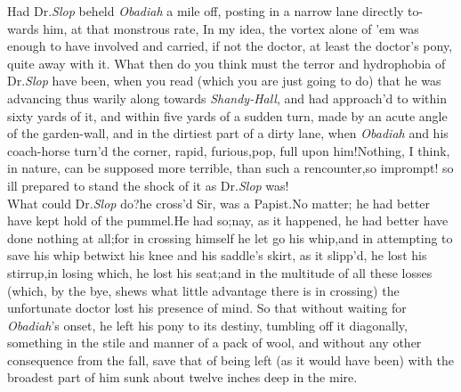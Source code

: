 \documentclass{article}
\begin{document}
Had Dr.\@ \textit{Slop} beheld \textit{Obadiah} a mile\break
off, posting in a narrow lane directly to-\break
wards him, at that monstrous rate,\tsh\break
{}
\tsh In my idea, the vortex alone of\break
’em was enough to have involved and carried, if not the doctor, at least the
doctor’s pony, quite away with it. What then do you think
must the terror and hydrophobia of Dr.\@ \textit{Slop} have been, when
you read (which you are just going to do) that he was advancing
thus warily along towards \textit{Shandy-Hall}, and had
approach’d to
within sixty yards of it, and within five yards of a sudden turn,
made by an acute angle of the garden-wall,\break
\tsk and in the dirtiest part of a dirty lane,\break
\tsk when \textit{Obadiah} and his coach-horse 
turn’d the corner, rapid, furious,\tsk pop,\break
\tsk full upon him!\tsk Nothing, I think, in
nature, can be supposed more terrible,
than such a rencounter,\tsk so imprompt! 
so ill prepared to stand the shock
of it as Dr.\@ \textit{Slop} was!\\
\newpage
What could Dr.\@ \textit{Slop} do?\tsh he cross’d
Sir, was a Papist.\tsk No matter; he had better have kept
hold of the pummel.\break He had so;\tsk nay, as it
happened, he had better have done nothing at all;\tsk for in
crossing himself he let go his whip,\tsk\break and in
attempting to save his whip betwixt his knee and his
saddle’s skirt, as it slipp’d, he lost his stirrup,\tsk in
losing which, he lost his seat;\tsk and in the multitude of
all these losses (which, by the bye, shews what little
advantage there is in crossing) the unfortunate doctor lost
his presence of mind. So that without waiting for
\textit{Obadiah}’s onset, he left his pony to its destiny,
tumbling off it diagonally, something in the stile and
manner of a pack of wool, and without any other consequence
from the fall, save that of being left (as it would have
been)
with the broadest part of him sunk about twelve inches deep in the mire.
\end{document}
